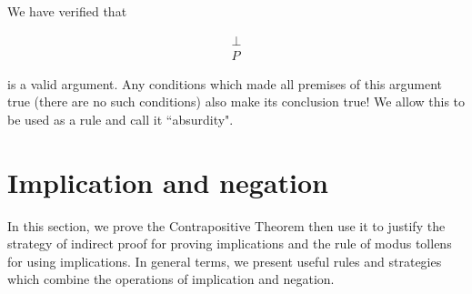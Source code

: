 \documentclass[12pt]{article}
\begin{document}
We have verified that

$$\begin{array}{c}

\perp \\ \hline

P

\end{array}$$

is a valid argument.  Any conditions which made all premises of this argument true (there are no such conditions) also make its conclusion true!  We allow this to be used
as a rule and call it ``absurdity".


\newpage

\section{Implication and negation}

In this section, we prove the Contrapositive Theorem then use it to justify the strategy of indirect proof for proving implications and the rule of modus tollens for using implications.  In general terms, we present useful rules and strategies which combine the operations of implication and negation.
\end{document}
